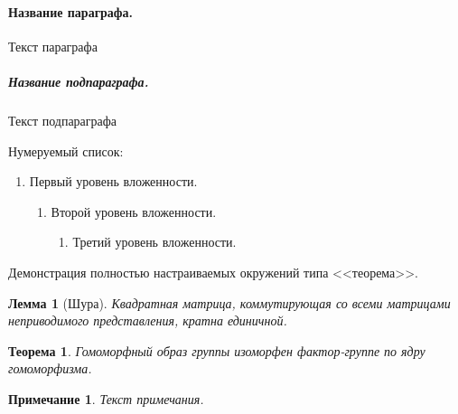\paragraph{Название параграфа.}
Текст параграфа
\subparagraph{Название подпараграфа.}
Текст подпараграфа

Нумеруемый список:
\begin{enumerate}
  \item Первый уровень вложенности.
  \begin{enumerate}
    \item Второй уровень вложенности.
    \begin{enumerate}
      \item Третий уровень вложенности.
    \end{enumerate}
  \end{enumerate}
\end{enumerate}

Демонстрация полностью настраиваемых окружений типа <<теорема>>.

\newtheorem{theorem}{Теорема}[chapter]
\def\theoremstyle{}
\def\postthetheorem{:}

\newtheorem{lemm}{Лемма}[chapter]
\def\thelemmstyle{\bfseries}
\def\oparglemmstyle{}
\def\lemmstyle{}
\def\preoparglemm{(}
\def\postoparglemm{):}

\newtheorem{remark}{Примечание}[chapter]
\def\remarkstyle{\itshape}
\def\theremarkstyle{}
\def\posttheremark{:}

\begin{lemm}[Шура]
Квадратная матрица, коммутирующая со всеми матрицами неприводимого представления, кратна единичной.
\end{lemm}

\begin{theorem}
Гомоморфный образ группы изоморфен фактор-группе по ядру гомоморфизма.
\end{theorem}

\begin{remark}
Текст примечания.
\end{remark}
